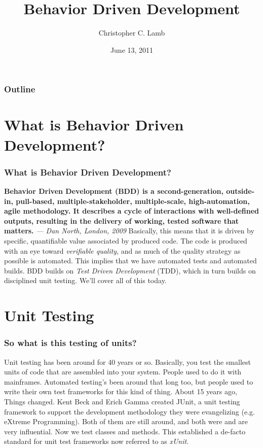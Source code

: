 \documentclass[t, 10pt]{beamer}
\title{Behavior Driven Development}
\author [Chris]{Christopher C. Lamb}
\institute[University of New Mexico]{
\inst {}Department of Electrical and Computer Engineering\\
University of New Mexico}
\date{June 13, 2011}
\begin{document}
\begin{frame}
\titlepage
\end{frame}


\begin{frame}
\frametitle{Outline}
\tableofcontents 
\end{frame}

\section{What is Behavior Driven Development?}

\begin{frame}
\frametitle{What is Behavior Driven Development?}
\textbf{Behavior Driven Development (BDD) is a second-generation, outside-in, pull-based, multiple-stakeholder, multiple-scale, high-automation, agile methodology. It describes a cycle of interactions with well-defined outputs, resulting in the delivery of working, tested software that matters.}
\newline
\textit{--- Dan North, London, 2009}
\newline
\newline
\newline
Basically, this means that it is driven by specific, quantifiable value associated by produced code.  The code is produced with an eye toward \textit{verifiable quality}, and as much of the quality strategy as possible is automated.  This implies that we have automated tests and automated builds.  BDD builds on \textit{Test Driven Development} (TDD), which in turn builds on disciplined unit testing.  We'll cover all of this today.
\end{frame}

\section{Unit Testing}

\begin{frame}
\frametitle{So what is this testing of units?}
Unit testing has been around for 40 years or so.  Basically, you test the smallest units of code that are assembled into your system.  People used to do it with mainframes.  Automated testing's been around that long too, but people used to write their own test frameworks for this kind of thing.  About 15 years ago, Things changed.
\newline
\newline
Kent Beck and Erich Gamma created JUnit, a unit testing framework to support the development methodology they were evangelizing (e.g. eXtreme Programming).  Both of them are still around, and both were and are very influential.  Now we test classes and methods.
\newline
\newline
This established a de-facto standard for unit test frameworks now referred to as \textit{xUnit}.
\end{frame}
\end{document}
